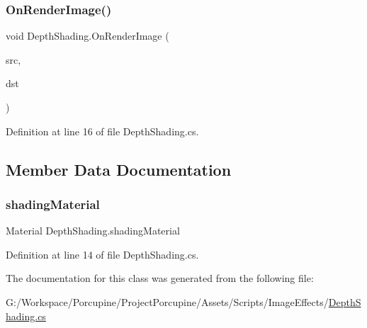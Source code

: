 \subsubsection{\texorpdfstring{On\+Render\+Image()}{OnRenderImage()}}
{\footnotesize\ttfamily void Depth\+Shading.\+On\+Render\+Image (\begin{DoxyParamCaption}\item[{Render\+Texture}]{src,  }\item[{Render\+Texture}]{dst }\end{DoxyParamCaption})}



Definition at line 16 of file Depth\+Shading.\+cs.



\subsection{Member Data Documentation}
\mbox{\label{class_depth_shading_ad5a4c8a9d7f6327252b4bcc769d248da}} 
\subsubsection{\texorpdfstring{shading\+Material}{shadingMaterial}}
{\footnotesize\ttfamily Material Depth\+Shading.\+shading\+Material}



Definition at line 14 of file Depth\+Shading.\+cs.



The documentation for this class was generated from the following file\+:\begin{DoxyCompactItemize}
\item 
G\+:/\+Workspace/\+Porcupine/\+Project\+Porcupine/\+Assets/\+Scripts/\+Image\+Effects/\hyperlink{_depth_shading_8cs}{Depth\+Shading.\+cs}\end{DoxyCompactItemize}
